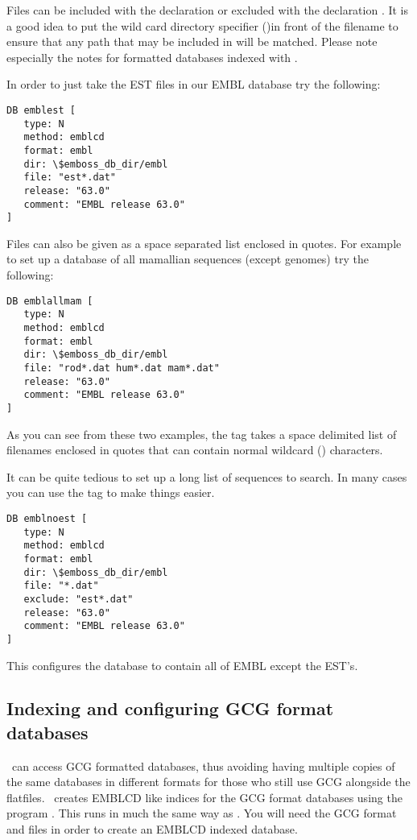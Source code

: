 \documentclass{report}
\begin{document}
Files can be included with the declaration  or excluded
with the declaration . It is a good idea to put the
wild card directory specifier (\filename{*/})in front of the filename
to ensure that any path that may be included in
 will be matched. Please note especially the
notes for  formatted databases indexed with
.

In order to just take the EST files in our EMBL database try the following:

\begin{verbatim}
DB emblest [
   type: N
   method: emblcd
   format: embl
   dir: \$emboss_db_dir/embl
   file: "est*.dat"
   release: "63.0"
   comment: "EMBL release 63.0"
]
\end{verbatim}

Files can also be given as a space separated list enclosed in
quotes. For example to set up a database of all mamallian sequences
(except genomes) try the following:

\begin{verbatim}
DB emblallmam [
   type: N
   method: emblcd
   format: embl
   dir: \$emboss_db_dir/embl
   file: "rod*.dat hum*.dat mam*.dat"
   release: "63.0"
   comment: "EMBL release 63.0"
]
\end{verbatim}

As you can see from these two examples, the  tag takes a
space delimited list of filenames enclosed in quotes that can contain
normal wildcard () characters.

It can be quite tedious to set up a long list of sequences to
search. In many cases you can use the  tag to make
things easier.

\begin{verbatim}
DB emblnoest [
   type: N
   method: emblcd
   format: embl
   dir: \$emboss_db_dir/embl
   file: "*.dat"
   exclude: "est*.dat"
   release: "63.0"
   comment: "EMBL release 63.0"
]
\end{verbatim}

This configures the  database to contain all of
EMBL except the EST's.

\subsection{Indexing and configuring GCG format databases}

\EMBOSS\ can access GCG formatted databases, thus avoiding having
multiple copies of the same databases in different formats for those
who still use GCG alongside the flatfiles.  \EMBOSS\ creates EMBLCD
like indices for the GCG format databases using the program
.  This runs in much the same way as
. You will need the GCG format  and
 files in order to create an EMBLCD indexed
database.
\end{document}
